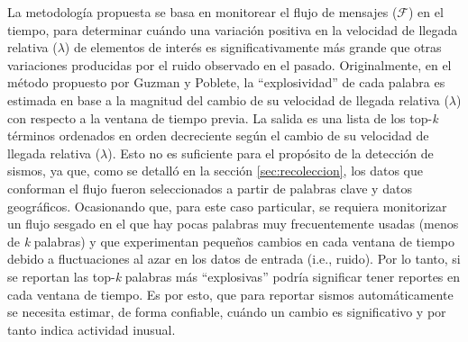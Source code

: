 La metodología propuesta se basa en monitorear el flujo de mensajes ($\mathcal{F}$) en el tiempo, para determinar cuándo una variación positiva en la velocidad de llegada relativa ($\lambda$) de elementos de interés es significativamente más grande que otras variaciones producidas por el ruido observado en el pasado.
%
Originalmente, en el método propuesto por Guzman y Poblete, la ``explosividad'' de cada palabra es estimada en base a la magnitud del cambio de su velocidad de llegada relativa ($\lambda$) con respecto a la ventana de tiempo previa.
%
La salida es una lista de los top-\emph{k} términos ordenados en orden decreciente según el cambio de su velocidad de llegada relativa ($\lambda$).
%
Esto no es suficiente para el propósito de la detección de sismos, ya que, como se detalló en la sección \ref{sec:recoleccion}, los datos que conforman el flujo fueron seleccionados a partir de palabras clave y datos geográficos. 
%
Ocasionando que, para este caso particular, se requiera monitorizar un flujo sesgado en el que hay pocas palabras muy frecuentemente usadas (menos de \emph{k} palabras) y que experimentan pequeños cambios en cada ventana de tiempo debido a fluctuaciones al azar en los datos de entrada (i.e., ruido).
%
Por lo tanto, si se reportan las top-\emph{k} palabras más ``explosivas'' podría significar tener reportes en cada ventana de tiempo.
%
Es por esto, que para reportar sismos automáticamente se necesita estimar, de forma confiable, cuándo un cambio es significativo y por tanto indica actividad inusual.

